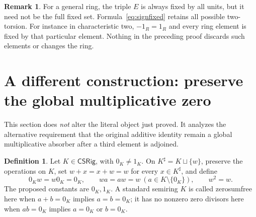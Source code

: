 \documentclass[11pt]{article}
\theoremstyle{definition}
\newtheorem{definition}[theorem]{Definition}
\newtheorem{remark}[theorem]{Remark}
\newcommand{\SSS}{\mathsf{CSRig}}
\begin{document}
\begin{remark}
For a general ring, the triple \(E\) is always fixed by all units, but
it need not be the full fixed set. Formula~\eqref{eq:signfixed} retains
all possible two-torsion. For instance in characteristic two, \(-1_R=1_R\)
and every ring element is fixed by that particular element. Nothing in
the preceding proof discards such elements or changes the ring.
\end{remark}

\section{A different construction: preserve the global multiplicative zero}

This section does \emph{not} alter the literal object just proved.
It analyzes the alternative requirement that the original additive identity
remain a global multiplicative absorber after a third element is adjoined.

\begin{definition}\label{def:sharp}
Let \(K\in\SSS\), with \(0_K\ne1_K\). On
\(K^\sharp=K\sqcup\{w\}\), preserve the operations on \(K\), set
\(w+x=x+w=w\) for every \(x\in K^\sharp\), and define
\[
 0_Kw=w0_K=0_K,\qquad
 wa=aw=w\ (a\in K\setminus\{0_K\}),\qquad w^2=w.
\tag{16}\label{eq:sharp}
\]
The proposed constants are \(0_K,1_K\). A standard semiring \(K\)
is called zerosumfree here when \(a+b=0_K\) implies
\(a=b=0_K\); it has no nonzero zero divisors here when \(ab=0_K\)
implies \(a=0_K\) or \(b=0_K\).
\end{definition}
\end{document}

